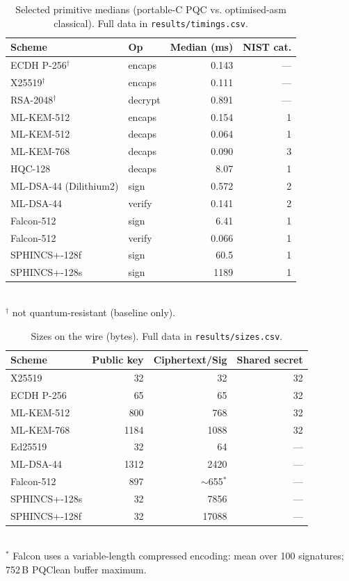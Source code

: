 \documentclass[conference]{IEEEtran}
\begin{document}
\begin{table}[t]
\caption{Selected primitive medians (portable-C PQC vs. optimised-asm
classical). Full data in \texttt{results/timings.csv}.}
\label{tab:timings}
\centering
\small
\begin{tabular}{llrr}
\toprule
Scheme & Op & Median (ms) & NIST cat. \\
\midrule
ECDH P-256$^\dagger$ & encaps & 0.143 & --- \\
X25519$^\dagger$ & encaps & 0.111 & --- \\
RSA-2048$^\dagger$ & decrypt & 0.891 & --- \\
ML-KEM-512 & encaps & 0.154 & 1 \\
ML-KEM-512 & decaps & 0.064 & 1 \\
ML-KEM-768 & decaps & 0.090 & 3 \\
HQC-128 & decaps & 8.07 & 1 \\
ML-DSA-44 (Dilithium2) & sign & 0.572 & 2 \\
ML-DSA-44 & verify & 0.141 & 2 \\
Falcon-512 & sign & 6.41 & 1 \\
Falcon-512 & verify & 0.066 & 1 \\
SPHINCS+-128f & sign & 60.5 & 1 \\
SPHINCS+-128s & sign & 1189 & 1 \\
\bottomrule
\end{tabular}
\\[2pt]
{\footnotesize $^\dagger$ not quantum-resistant (baseline only).}
\end{table}

\begin{table}[t]
\caption{Sizes on the wire (bytes). Full data in \texttt{results/sizes.csv}.}
\label{tab:sizes}
\centering
\small
\begin{tabular}{lrrr}
\toprule
Scheme & Public key & Ciphertext/Sig & Shared secret \\
\midrule
X25519 & 32 & 32 & 32 \\
ECDH P-256 & 65 & 65 & 32 \\
ML-KEM-512 & 800 & 768 & 32 \\
ML-KEM-768 & 1184 & 1088 & 32 \\
Ed25519 & 32 & 64 & --- \\
ML-DSA-44 & 1312 & 2420 & --- \\
Falcon-512 & 897 & $\sim$655$^\ast$ & --- \\
SPHINCS+-128s & 32 & 7856 & --- \\
SPHINCS+-128f & 32 & 17088 & --- \\
\bottomrule
\end{tabular}
\\[2pt]
{\footnotesize $^\ast$ Falcon uses a variable-length compressed encoding: mean
over 100 signatures; 752\,B PQClean buffer maximum.}
\end{table}
\end{document}
